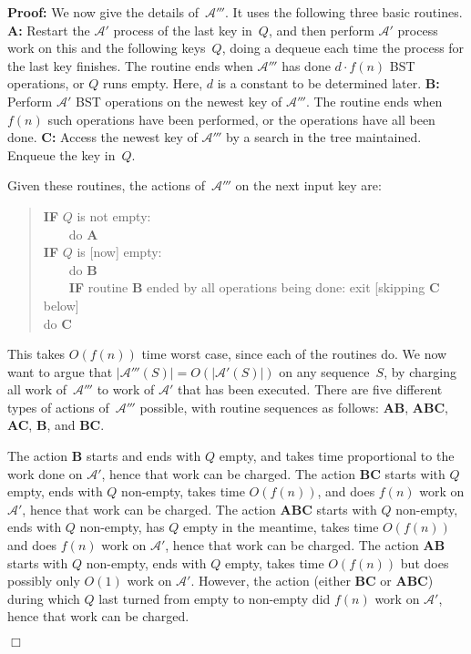 \documentclass[11pt]{article}
\newenvironment{proof}{\noindent\textbf{Proof: }\ignorespaces}
  {\hspace*{\fill}$\Box$\medskip}
\def\A{{\mathcal{A}}}
\begin{document}
\begin{proof}
We now give the details of~$\A'''$. It uses the following three basic
routines.
\textbf{A:} Restart the $\A'$ process of the last key in~$Q$, and then
perform $\A'$ process work on this and the following keys~$Q$, doing a
dequeue each time the process for the last key finishes. The routine
ends when $\A'''$ has done $d \cdot f(n)$ BST operations, or $Q$ runs
empty. Here, $d$ is a constant to be determined later.
\textbf{B:} Perform $\A'$ BST operations on the newest key of $\A'''$. The
routine ends when $f(n)$ such operations have been performed, or the
operations have all been done.
\textbf{C:} Access the newest key of $\A'''$ by a search in the tree
maintained. Enqueue the key in~$Q$.

Given these routines, the actions of~$\A'''$ on the next input key are:
\begin{quote}
\textbf{IF} $Q$ is not empty:\\
\mbox{}~~~~do \textbf{A}\\
\textbf{IF} $Q$ is [now] empty:\\
\mbox{}~~~~do \textbf{B}\\
\mbox{}~~~~\textbf{IF} routine \textbf{B} ended by all operations being
done: exit [skipping \textbf{C} below]\\
do \textbf{C}
\end{quote}

This takes $O(f(n))$ time worst case, since each of the routines
do. We now want to argue that $|\A'''(S)| = O(|\A'(S)|)$ on any
sequence~$S$, by charging all work of~$\A'''$ to work of $\A'$ that has
been executed. There are five different types of actions of~$\A'''$
possible, with routine sequences as follows: \textbf{AB}, \textbf{ABC},
\textbf{AC}, \textbf{B}, and \textbf{BC}.

The action \textbf{B} starts and ends with $Q$ empty, and takes time
proportional to the work done on $\A'$, hence that work can be charged.
The action \textbf{BC} starts with $Q$ empty, ends with $Q$ non-empty,
takes time $O(f(n))$, and does $f(n)$ work on $\A'$, hence that work
can be charged.
The action \textbf{ABC} starts with $Q$ non-empty, ends with $Q$
non-empty, has $Q$ empty in the meantime, takes time $O(f(n))$ and
does $f(n)$ work on $\A'$, hence that work can be charged.
The action \textbf{AB} starts with $Q$ non-empty, ends with $Q$ empty,
takes time $O(f(n))$ but does possibly only $O(1)$ work on
$\A'$. However, the action (either \textbf{BC} or \textbf{ABC}) during
which $Q$ last turned from empty to non-empty did $f(n)$ work on $\A'$,
hence that work can be charged.


\end{proof}
\end{document}
